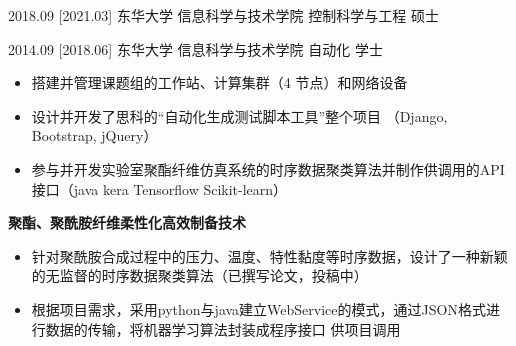 \documentclass[zh]{resume}
\begin{document}
\begin{competences}
    
\end{competences}

\begin{educations}
  \education%
    {2018.09}%
    [2021.03]%
    {东华大学}%
    {信息科学与技术学院}%
    {控制科学与工程}%
    {硕士}

  \separator{0.5ex}
  \education%
    {2014.09}%
    [2018.06]%
    {东华大学}%
    {信息科学与技术学院}%
    {自动化}%
    {学士}
\end{educations}

\begin{itemize}  
  \item 搭建并管理课题组的工作站、计算集群（4 节点）和网络设备  
  \item 设计并开发了思科的\enquote{自动化生成测试脚本工具}整个项目
    （Django, Bootstrap, jQuery）
  \item 参与并开发实验室聚酯纤维仿真系统的时序数据聚类算法并制作供调用的API接口（java kera Tensorflow Scikit-learn）
\end{itemize}

\textbf{聚酯、聚酰胺纤维柔性化高效制备技术}
\begin{itemize}
  \item 针对聚酰胺合成过程中的压力、温度、特性黏度等时序数据，设计了一种新颖的无监督的时序数据聚类算法（已撰写论文，投稿中）
  \item 根据项目需求，采用python与java建立WebService的模式，通过JSON格式进行数据的传输，将机器学习算法封装成程序接口 供项目调用
  
\end{itemize}
\end{document}
